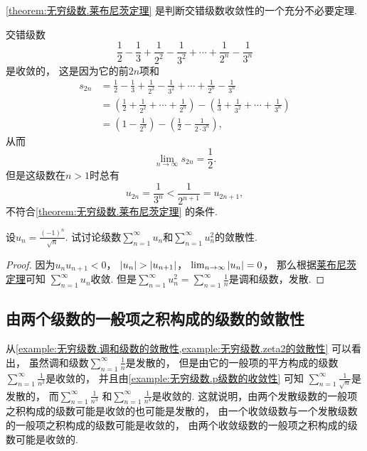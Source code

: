 \cref{theorem:无穷级数.莱布尼茨定理} 是判断交错级数收敛性的一个充分不必要定理.
\begin{example}
交错级数\[
	\frac{1}{2} - \frac{1}{3}
	+ \frac{1}{2^2} - \frac{1}{3^2}
	+ \dotsm + \frac{1}{2^n} - \frac{1}{3^n}
\]是收敛的，
这是因为它的前\(2n\)项和\begin{align*}
	s_{2n} &= \frac{1}{2} - \frac{1}{3}
	+ \frac{1}{2^2} - \frac{1}{3^2}
	+ \dotsm + \frac{1}{2^n} - \frac{1}{3^n} \\
	&= \left(\frac{1}{2} + \frac{1}{2^2} + \dotsm + \frac{1}{2^n}\right)
	- \left(\frac{1}{3} + \frac{1}{3^2} + \dotsm + \frac{1}{3^n}\right) \\
	&= \left(1 - \frac{1}{2^n}\right)
	- \left(\frac{1}{2} - \frac{1}{2\cdot3^n}\right),
\end{align*}
从而\[
	\lim_{n\to\infty} s_{2n} = \frac{1}{2}.
\]
但是这级数在\(n>1\)时总有\[
	u_{2n} = \frac{1}{3^n} < \frac{1}{2^{n+1}} = u_{2n+1},
\]不符合\cref{theorem:无穷级数.莱布尼茨定理} 的条件.
\end{example}

\begin{example}\label{example:交错级数.逐项平方以后发散的特例}
设\(u_n = \frac{(-1)^n}{\sqrt{n}}\).
试讨论级数\(\sum_{n=1}^\infty u_n\)和\(\sum_{n=1}^\infty u_n^2\)的敛散性.
\begin{proof}
因为\(u_n u_{n+1} < 0\)，
\(\abs{u_n} > \abs{u_{n+1}}\)，
\(\lim_{n\to\infty} \abs{u_n} = 0\)，
那么根据\hyperref[theorem:无穷级数.莱布尼茨定理]{莱布尼茨定理}可知
\(\sum_{n=1}^\infty u_n\)收敛.
但是\(\sum_{n=1}^\infty u_n^2
= \sum_{n=1}^\infty \frac{1}{n}\)是调和级数，发散.
\end{proof}
\end{example}

\subsection{由两个级数的一般项之积构成的级数的敛散性}
从\cref{example:无穷级数.调和级数的敛散性,example:无穷级数.zeta2的敛散性} 可以看出，
虽然调和级数\(\sum_{n=1}^\infty \frac1n\)是发散的，
但是由它的一般项的平方构成的级数\(\sum_{n=1}^\infty \frac1{n^2}\)是收敛的，
并且由\cref{example:无穷级数.p级数的收敛性} 可知
\(\sum_{n=1}^\infty \frac1{\sqrt{n}}\)是发散的，
而\(\sum_{n=1}^\infty \frac1{n^3}\)
和\(\sum_{n=1}^\infty \frac1{n^4}\)是收敛的.
这就说明，由两个发散级数的一般项之积构成的级数可能是收敛的也可能是发散的，
由一个收敛级数与一个发散级数的一般项之积构成的级数可能是收敛的，
由两个收敛级数的一般项之积构成的级数可能是收敛的.

